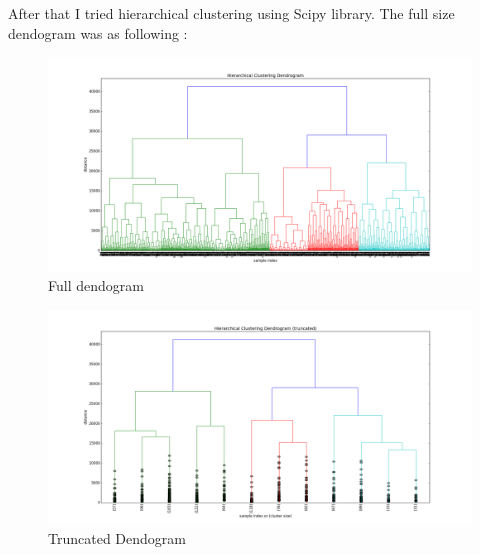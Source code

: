 \documentclass{article}
\begin{document}
After that I tried hierarchical clustering using Scipy library. The full size dendogram was as following :
\begin{landscape}

\begin{figure}[H]
\includegraphics[scale=0.7,trim={4cm 1cm 5cm 2cm},clip]{dendogram_full.png}
\caption{Full dendogram}
\end{figure} 

\begin{figure}[H]
\includegraphics[scale=0.69,trim={4cm 0cm 5cm 2cm},clip]{dendogram_truncated_clustersize.png}
\caption{Truncated Dendogram}
\end{figure} 
\end{landscape}
\end{document}
